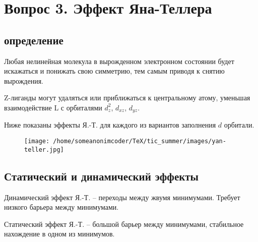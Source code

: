 

\section{Вопрос 3. Эффект Яна-Теллера}

\subsection*{определение}
Любая нелинейная молекула в вырожденном электронном состоянии будет искажаться и понижать свою симметрию, тем самым приводя к снятию вырождения.

Z-лиганды могут удаляться или приближаться к центральному атому, уменьшая взаимодействие L с орбиталями $d_z^2$, $d_{xz}$, $d_{yz}$.

Ниже показаны эффекты Я.-Т. для каждого из вариантов заполнения $d$ орбитали.

\begin{figure}[H]
\centering
\texttt{[image: /home/someanonimcoder/TeX/tic\_summer/images/yan-teller.jpg]}
\end{figure}

\subsection*{Статический и динамический эффекты}

Динамический эффект Я.-Т. -- переходы между жвумя минимумами. Требует низкого барьера между минимумами.

Статический эффект Я.-Т. -- большой барьер между минимумами, стабильное нахождение в одном из минимумов.

